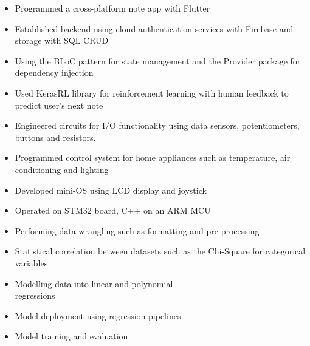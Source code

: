 \documentclass[11pt,a4paper,ragged2e]{altacv}
\begin{document}
\begin{paracol}{1}
\begin{itemize}
\item Programmed a cross-platform note app with Flutter
\item Established backend using cloud authentication services with Firebase and storage with SQL CRUD 
\item Using the BLoC pattern for state management and the Provider package for dependency injection
\item Used KerasRL library for reinforcement learning with human feedback to predict user's next note
\end{itemize}
\tightdivider

\begin{itemize}
\item Engineered circuits for I/O functionality using data sensors, potentiometers, buttons and resistors.
\item Programmed control system for home appliances such as temperature, air conditioning and lighting 
\item Developed mini-OS using LCD display and joystick 
\item Operated on STM32 board, C++ on an ARM MCU
\end{itemize}



\begin{itemize}
\item Performing data wrangling  such as formatting and pre-processing
\item Statistical correlation between datasets such as the Chi-Square for categorical variables
\item Modelling data into linear and polynomial \\ regressions
\item Model deployment using regression pipelines
\item Model training and evaluation
\end{itemize}
\tightdivider


\end{paracol}
\end{document}
